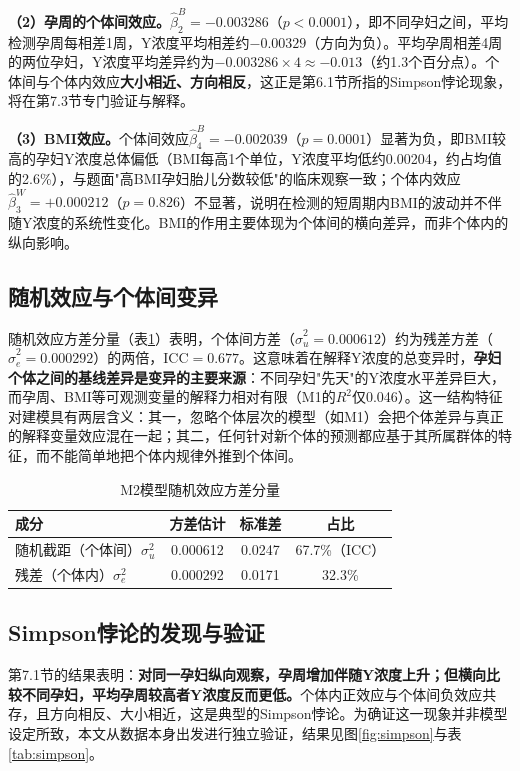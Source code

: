 \documentclass[12pt,a4paper]{ctexart}
\begin{document}
\textbf{（2）孕周的个体间效应。}$\hat{\beta}_2^B=-0.003286$（$p<0.0001$），即不同孕妇之间，平均检测孕周每相差1周，Y浓度平均相差约$-0.00329$（方向为负）。平均孕周相差4周的两位孕妇，Y浓度平均差异约为$-0.003286\times4\approx-0.013$（约1.3个百分点）。个体间与个体内效应\textbf{大小相近、方向相反}，这正是第6.1节所指的Simpson悖论现象，将在第7.3节专门验证与解释。

\textbf{（3）BMI效应。}个体间效应$\hat{\beta}_4^B=-0.002039$（$p=0.0001$）显著为负，即BMI较高的孕妇Y浓度总体偏低（BMI每高1个单位，Y浓度平均低约0.00204，约占均值的2.6\%），与题面"高BMI孕妇胎儿分数较低"的临床观察一致；个体内效应$\hat{\beta}_3^W=+0.000212$（$p=0.826$）不显著，说明在检测的短周期内BMI的波动并不伴随Y浓度的系统性变化。BMI的作用主要体现为个体间的横向差异，而非个体内的纵向影响。

\subsection{随机效应与个体间变异}

随机效应方差分量（表\ref{tab:var}）表明，个体间方差（$\hat{\sigma}_u^2=0.000612$）约为残差方差（$\hat{\sigma}_e^2=0.000292$）的两倍，ICC$=0.677$。这意味着在解释Y浓度的总变异时，\textbf{孕妇个体之间的基线差异是变异的主要来源}：不同孕妇"先天"的Y浓度水平差异巨大，而孕周、BMI等可观测变量的解释力相对有限（M1的$R^2$仅0.046）。这一结构特征对建模具有两层含义：其一，忽略个体层次的模型（如M1）会把个体差异与真正的解释变量效应混在一起；其二，任何针对新个体的预测都应基于其所属群体的特征，而不能简单地把个体内规律外推到个体间。

\begin{table}[htbp]
\centering
\caption{M2模型随机效应方差分量}
\label{tab:var}
\begin{tabular}{lccc}
\toprule
成分 & 方差估计 & 标准差 & 占比 \\
\midrule
随机截距（个体间）$\sigma_u^2$ & 0.000612 & 0.0247 & 67.7\%（ICC） \\
残差（个体内）$\sigma_e^2$ & 0.000292 & 0.0171 & 32.3\% \\
\bottomrule
\end{tabular}
\end{table}

\subsection{Simpson悖论的发现与验证}

第7.1节的结果表明：\textbf{对同一孕妇纵向观察，孕周增加伴随Y浓度上升；但横向比较不同孕妇，平均孕周较高者Y浓度反而更低。}个体内正效应与个体间负效应共存，且方向相反、大小相近，这是典型的Simpson悖论\cite{simpson}。为确证这一现象并非模型设定所致，本文从数据本身出发进行独立验证，结果见图\ref{fig:simpson}与表\ref{tab:simpson}。
\end{document}
